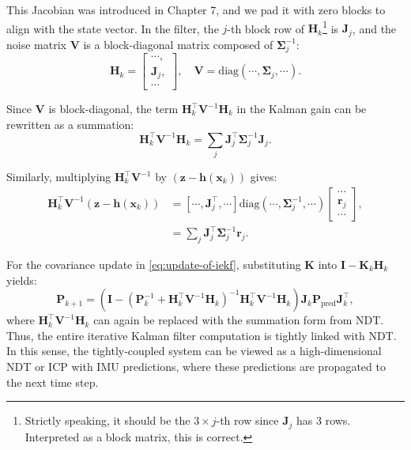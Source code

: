 This Jacobian was introduced in Chapter 7, and we pad it with zero blocks to align with the state vector. In the filter, the \( j \)-th block row of \(\bm{H}_k\)\footnote{Strictly speaking, it should be the \( 3 \times j \)-th row since \(\bm{J}_j\) has 3 rows. Interpreted as a block matrix, this is correct.} is \(\bm{J}_j\), and the noise matrix \(\bm{V}\) is a block-diagonal matrix composed of \(\boldsymbol{\Sigma}^{-1}_j\):  
\begin{equation}\label{key}  
	\bm{H}_k = \begin{bmatrix}  
		\cdots, \\  
		\bm{J}_j, \\  
		\cdots  
	\end{bmatrix}, \quad \bm{V} = \mathrm{diag}(\cdots, \boldsymbol{\Sigma}_j, \cdots).  
\end{equation}  

Since \(\bm{V}\) is block-diagonal, the term \(\bm{H}_k^\top \bm{V}^{-1} \bm{H}_k\) in the Kalman gain can be rewritten as a summation:  
\begin{equation}\label{key}  
	\bm{H}_k^\top \bm{V}^{-1} \bm{H}_k = \sum\limits_{j} \bm{J}_j^\top \boldsymbol{\Sigma}_j^{-1} \bm{J}_j.  
\end{equation}  

Similarly, multiplying \(\bm{H}_k^\top \bm{V}^{-1}\) by \((\bm{z} - \bm{h}(\bm{x}_k))\) gives:  
\begin{align}\label{key}  
	\bm{H}_k^\top \bm{V}^{-1} (\bm{z} - \bm{h}(\bm{x}_k)) &= \left[\cdots, \bm{J}_j^\top, \cdots \right] \mathrm{diag}(\cdots, \boldsymbol{\Sigma}_j^{-1}, \cdots) \begin{bmatrix}  
		\cdots \\ \bm{r}_j \\ \cdots  
	\end{bmatrix}, \\  
	&= \sum\limits_{j} \bm{J}_j^\top \boldsymbol{\Sigma}_j^{-1} \bm{r}_j.  
\end{align}  

For the covariance update in \eqref{eq:update-of-iekf}, substituting \(\bm{K}\) into \(\bm{I} - \bm{K}_k \bm{H}_k\) yields:  
\begin{equation}\label{key}  
	\bm{P}_{k+1} = (\bm{I} - (\bm{P}_k^{-1} + \bm{H}_k^\top \bm{V}^{-1} \bm{H}_k)^{-1} \bm{H}_k^\top \bm{V}^{-1} \bm{H}_k) \bm{J}_k \bm{P}_{\mathrm{pred}} \bm{J}_k^\top,  
\end{equation}  
where \(\bm{H}_k^\top \bm{V}^{-1} \bm{H}_k\) can again be replaced with the summation form from NDT. Thus, the entire iterative Kalman filter computation is tightly linked with NDT. In this sense, the tightly-coupled system can be viewed as a high-dimensional NDT or ICP with IMU predictions, where these predictions are propagated to the next time step.
\
